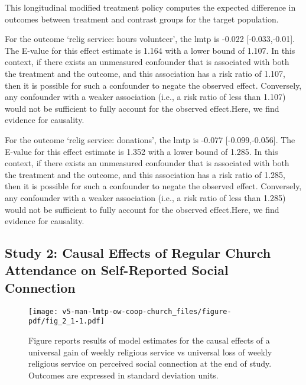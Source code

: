\documentclass[
  singlecolumn]{article}
\begin{document}
This longitudinal modified treatment policy computes the expected
difference in outcomes between treatment and contrast groups for the
target population.

For the outcome `relig service: hours volunteer', the lmtp is -0.022
{[}-0.033,-0.01{]}. The E-value for this effect estimate is 1.164 with a
lower bound of 1.107. In this context, if there exists an unmeasured
confounder that is associated with both the treatment and the outcome,
and this association has a risk ratio of 1.107, then it is possible for
such a confounder to negate the observed effect. Conversely, any
confounder with a weaker association (i.e., a risk ratio of less than
1.107) would not be sufficient to fully account for the observed
effect.Here, we find evidence for causality.

For the outcome `relig service: donations', the lmtp is -0.077
{[}-0.099,-0.056{]}. The E-value for this effect estimate is 1.352 with
a lower bound of 1.285. In this context, if there exists an unmeasured
confounder that is associated with both the treatment and the outcome,
and this association has a risk ratio of 1.285, then it is possible for
such a confounder to negate the observed effect. Conversely, any
confounder with a weaker association (i.e., a risk ratio of less than
1.285) would not be sufficient to fully account for the observed
effect.Here, we find evidence for causality.

\newpage{}

\subsection{Study 2: Causal Effects of Regular Church Attendance on
Self-Reported Social
Connection}\label{study-2-causal-effects-of-regular-church-attendance-on-self-reported-social-connection}

\begin{figure}[H]

{\centering \texttt{[image: v5-man-lmtp-ow-coop-church\_files/figure-pdf/fig\_2\_1-1.pdf]}

}

\caption{Figure reports results of model estimates for the causal
effects of a universal gain of weekly religious service vs universal
loss of weekly religious service on perceived social connection at the
end of study. Outcomes are expressed in standard deviation units.}

\end{figure}%
\end{document}
